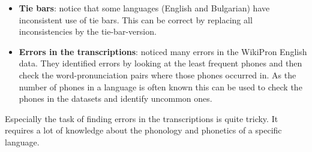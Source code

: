\begin{itemize}
\item \textbf{Tie bars}: \cite{Ashby&Bartley.2021} notice that some languages (English and Bulgarian) have inconsistent use of tie bars. This can be correct by replacing all inconsistencies by the tie-bar-version.
\item \textbf{Errors in the transcriptions}: \citet{gautam.2021} noticed many errors in the WikiPron English data. They identified errors by looking at the least frequent phones and then check the word-pronunciation pairs where those phones occurred in. As the number of phones in a language is often known this can be used to check the phones in the datasets and identify uncommon ones. 
\end{itemize}

Especially the task of finding errors in the transcriptions is quite tricky. It requires a lot of knowledge about the phonology and phonetics of a specific language. 
